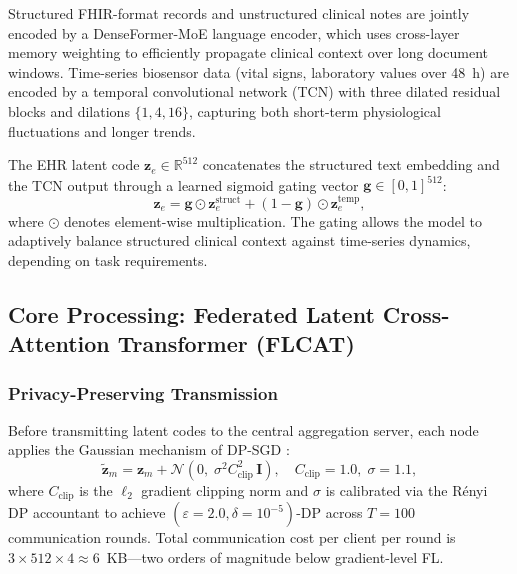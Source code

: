 \documentclass[a4paper,fleqn]{cas-dc}
\begin{document}
Structured FHIR-format records and unstructured clinical notes are jointly
encoded by a DenseFormer-MoE \citep{denseformer2024} language encoder, which
uses cross-layer memory weighting to efficiently propagate clinical context
over long document windows. Time-series biosensor data (vital signs, laboratory
values over 48~h) are encoded by a temporal convolutional network (TCN) with
three dilated residual blocks and dilations $\{1,4,16\}$, capturing both
short-term physiological fluctuations and longer trends.

The EHR latent code $\mathbf{z}_e \in \mathbb{R}^{512}$ concatenates the
structured text embedding and the TCN output through a learned sigmoid gating
vector $\mathbf{g} \in [0,1]^{512}$:
\begin{equation}
\mathbf{z}_e = \mathbf{g} \odot \mathbf{z}_e^{\text{struct}} +
(1-\mathbf{g}) \odot \mathbf{z}_e^{\text{temp}},
\label{eq:ehr_gate}
\end{equation}
where $\odot$ denotes element-wise multiplication. The gating allows the model
to adaptively balance structured clinical context against time-series dynamics,
depending on task requirements.

\subsection{Core Processing: Federated Latent Cross-Attention Transformer (FLCAT)}
\label{subsec:flcat}

\subsubsection{Privacy-Preserving Transmission}

Before transmitting latent codes to the central aggregation server, each node
applies the Gaussian mechanism of DP-SGD \citep{abadi2016dpsgd}:
\begin{equation}
\tilde{\mathbf{z}}_m = \mathbf{z}_m +
\mathcal{N}\!\left(0,\;\sigma^2 C_{\mathrm{clip}}^2\,\mathbf{I}\right),
\quad C_{\mathrm{clip}}\!=\!1.0,\;\sigma\!=\!1.1,
\label{eq:dp}
\end{equation}
where $C_{\mathrm{clip}}$ is the $\ell_2$ gradient clipping norm and $\sigma$
is calibrated via the R\'{e}nyi DP accountant \citep{mironov2017renyi} to
achieve $(\varepsilon\!=\!2.0,\delta\!=\!10^{-5})$-DP across $T\!=\!100$
communication rounds. Total communication cost per client per round is
$3\!\times\!512\!\times\!4\!\approx\!6$~KB---two orders of magnitude below
gradient-level FL.
\end{document}
